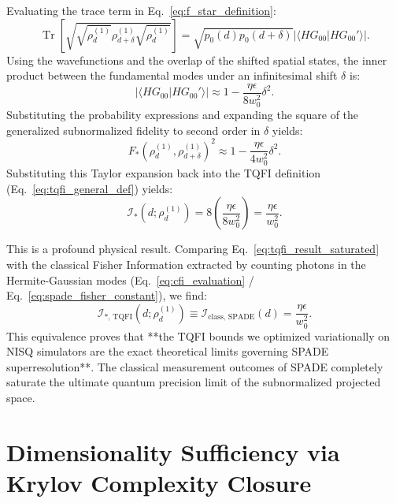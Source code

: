 Evaluating the trace term in Eq.~\eqref{eq:f_star_definition}:
\begin{equation}
    \operatorname{Tr}\left[\sqrt{\sqrt{\rho_d^{(1)}}\rho_{d+\delta}^{(1)}\sqrt{\rho_d^{(1)}}}\right] = \sqrt{p_0(d) p_0(d+\delta)} \left|\langle HG_{00} | HG_{00}' \rangle\right|.
\end{equation}
Using the wavefunctions and the overlap of the shifted spatial states, the inner product between the fundamental modes under an infinitesimal shift $\delta$ is:
\begin{equation}
    \left|\langle HG_{00} | HG_{00}' \rangle\right| \approx 1 - \frac{\eta\epsilon}{8w_0^2}\delta^2.
\end{equation}
Substituting the probability expressions and expanding the square of the generalized subnormalized fidelity to second order in $\delta$ yields:
\begin{equation}
    F_*\left(\rho^{(1)}_d, \rho^{(1)}_{d+\delta}\right)^2 \approx 1 - \frac{\eta \epsilon}{4w_0^2}\delta^2.
    \label{eq:fidelity_taylor_expansion_link}
\end{equation}
Substituting this Taylor expansion back into the TQFI definition (Eq.~\eqref{eq:tqfi_general_def}) yields:
\begin{equation}
    \mathcal{I}_*\left(d; \rho^{(1)}_d\right) = 8 \left( \frac{\eta \epsilon}{8w_0^2} \right) = \frac{\eta \epsilon}{w_0^2}.
    \label{eq:tqfi_result_saturated}
\end{equation}

This is a profound physical result. Comparing Eq.~\eqref{eq:tqfi_result_saturated} with the classical Fisher Information extracted by counting photons in the Hermite-Gaussian modes (Eq.~\eqref{eq:cfi_evaluation} / Eq.~\eqref{eq:spade_fisher_constant}), we find:
\begin{equation}
    \mathcal{I}_{*\text{, TQFI}}\left(d; \rho^{(1)}_d\right) \equiv \mathcal{I}_{\text{class, SPADE}}(d) = \frac{\eta \epsilon}{w_0^2}.
    \label{eq:saturation_equivalence}
\end{equation}
This equivalence proves that **the TQFI bounds we optimized variationally on NISQ simulators are the exact theoretical limits governing SPADE superresolution**. The classical measurement outcomes of SPADE completely saturate the ultimate quantum precision limit of the subnormalized projected space.

\section{Dimensionality Sufficiency via Krylov Complexity Closure}

